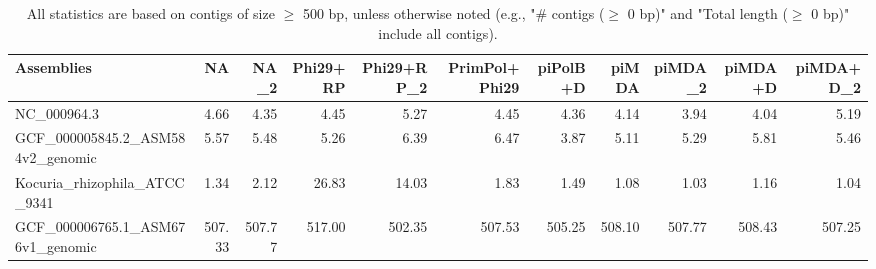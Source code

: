\documentclass[12pt,a4paper]{article}
\begin{document}
\begin{table}[ht]
\begin{center}
\caption{All statistics are based on contigs of size $\geq$ 500 bp, unless otherwise noted (e.g., "\# contigs ($\geq$ 0 bp)" and "Total length ($\geq$ 0 bp)" include all contigs).}
\begin{tabular}{|l*{10}{|r}|}
\hline
Assemblies & NA & NA\_2 & Phi29+RP & Phi29+RP\_2 & PrimPol+Phi29 & piPolB+D & piMDA & piMDA\_2 & piMDA+D & piMDA+D\_2 \\ \hline
NC\_000964.3 & 4.66 & 4.35 & 4.45 & 5.27 & 4.45 & 4.36 & 4.14 & 3.94 & 4.04 & 5.19 \\ \hline
GCF\_000005845.2\_ASM584v2\_genomic & 5.57 & 5.48 & 5.26 & 6.39 & 6.47 & 3.87 & 5.11 & 5.29 & 5.81 & 5.46 \\ \hline
Kocuria\_rhizophila\_ATCC\_9341 & 1.34 & 2.12 & 26.83 & 14.03 & 1.83 & 1.49 & 1.08 & 1.03 & 1.16 & 1.04 \\ \hline
GCF\_000006765.1\_ASM676v1\_genomic & 507.33 & 507.77 & 517.00 & 502.35 & 507.53 & 505.25 & 508.10 & 507.77 & 508.43 & 507.25 \\ \hline
\end{tabular}
\end{center}
\end{table}
\end{document}
